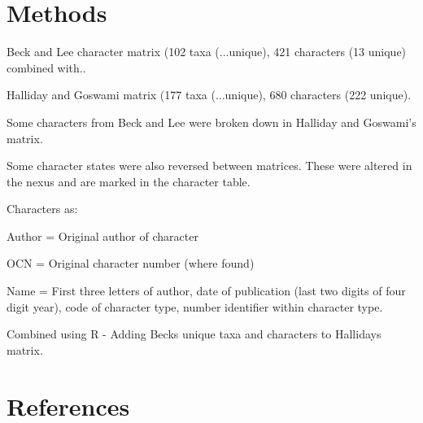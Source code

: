 \documentclass[a4paper,11pt]{article}
\begin{document}
\section{Methods}
 
Beck and Lee character matrix \citep{beck2014ancient} (102 taxa (...unique), 421 characters (13 unique) combined with..  

Halliday and Goswami matrix \citep{halliday2016eutherian} (177 taxa (...unique), 680 characters (222 unique). 
 
Some characters from Beck and Lee were broken down in Halliday and Goswami’s matrix.

Some character states were also reversed between matrices. These were altered in the nexus and are marked in the character table. 
 
Characters as: 

Author = Original author of character

OCN = Original character number (where found)

Name = First three letters of author, date of publication (last two digits of four digit year), code of character type, number identifier within character type. 
 
Combined using R - Adding Becks unique taxa and characters to Hallidays matrix. 
 

\section{References}


\cite{halliday2016impact}

\cite{halliday2017resolving}

\cite{halliday2016eutherians}



\end{document}
